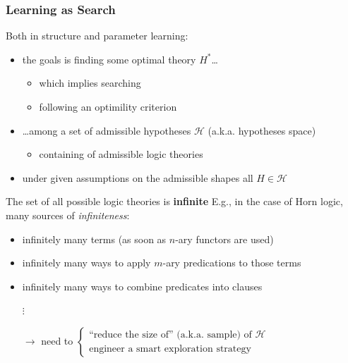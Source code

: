 \documentclass[presentation]{beamer}\mode<presentation>{\usetheme{AMSBolognaFC}}
\begin{document}
\begin{frame}[allowframebreaks]
    \frametitle{Learning as Search}

    Both in structure and parameter learning:
    \bigskip
    \begin{itemize}
        \item the goals is \alert{finding} some \alert{optimal} theory $H^*$\ldots
        \begin{itemize}
            \item which implies \alert{searching}
            \item following an \alert{optimility criterion}
        \end{itemize}

        \bigskip

        \item \ldots among a set of admissible hypotheses $\mathcal{H}$ (a.k.a. \alert{hypotheses space})
        \begin{itemize}
            \item containing of admissible \alert{logic theories}
        \end{itemize}

        \bigskip

        \item under \alert{given assumptions} on the admissible shapes all $H \in \mathcal{H}$ 
    \end{itemize}

    \framebreak

    \begin{block}{The set of all possible logic theories is \textbf{infinite}}
        E.g., in the case of \alert{Horn logic}, many sources of \emph{infiniteness}:
        \begin{itemize}
            \item infinitely many terms (as soon as $n$-ary functors are used)
            \item infinitely many ways to apply $m$-ary predications to those terms
            \item infinitely many ways to combine predicates into clauses
            \item[$\vdots$]
            \medskip
            \item[$\rightarrow$] need to $\begin{cases}
                \text{``reduce the size of'' (a.k.a. sample) of } \mathcal{H}
                \\
                \text{engineer a smart exploration strategy}
            \end{cases}$
        \end{itemize}
    \end{block}

\end{frame}
\end{document}
